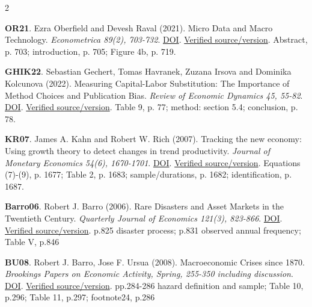 \documentclass[10pt,a4paper,landscape]{article}
\begin{document}
\begin{multicols}{2}
\begin{minipage}{\linewidth}\hypertarget{ref:OR21}{}\textbf{OR21}. Ezra Oberfield and Devesh Raval (2021). Micro Data and Macro Technology. \emph{Econometrica 89(2), 703-732}. \href{https://doi.org/10.3982/ECTA12807}{DOI}. \href{https://ezraoberfield.github.io/CESAggregation.pdf}{Verified source/version}. Abstract, p. 703; introduction, p. 705; Figure 4b, p. 719.\end{minipage}\par
\begin{minipage}{\linewidth}\hypertarget{ref:GHIK22}{}\textbf{GHIK22}. Sebastian Gechert, Tomas Havranek, Zuzana Irsova and Dominika Kolcunova (2022). Measuring Capital-Labor Substitution: The Importance of Method Choices and Publication Bias. \emph{Review of Economic Dynamics 45, 55-82}. \href{https://doi.org/10.1016/j.red.2021.05.003}{DOI}. \href{https://meta-analysis.cz/sigma/sigma2.pdf}{Verified source/version}. Table 9, p. 77; method: section 5.4; conclusion, p. 78.\end{minipage}\par
\begin{minipage}{\linewidth}\hypertarget{ref:KR07}{}\textbf{KR07}. James A. Kahn and Robert W. Rich (2007). Tracking the new economy: Using growth theory to detect changes in trend productivity. \emph{Journal of Monetary Economics 54(6), 1670-1701}. \href{https://doi.org/10.1016/j.jmoneco.2006.07.008}{DOI}. \href{https://pages.stern.nyu.edu/~jkahn/Papers/kahnrich_jme.pdf}{Verified source/version}. Equations (7)-(9), p. 1677; Table 2, p. 1683; sample/durations, p. 1682; identification, p. 1687.\end{minipage}\par
\begin{minipage}{\linewidth}\hypertarget{ref:Barro06}{}\textbf{Barro06}. Robert J. Barro (2006). Rare Disasters and Asset Markets in the Twentieth Century. \emph{Quarterly Journal of Economics 121(3), 823-866}. \href{https://doi.org/10.1162/qjec.121.3.823}{DOI}. \href{https://dash.harvard.edu/bitstreams/7312037c-67b1-6bd4-e053-0100007fdf3b/download}{Verified source/version}. p.825 disaster process; p.831 observed annual frequency; Table V, p.846\end{minipage}\par
\begin{minipage}{\linewidth}\hypertarget{ref:BU08}{}\textbf{BU08}. Robert J. Barro, Jose F. Ursua (2008). Macroeconomic Crises since 1870. \emph{Brookings Papers on Economic Activity, Spring, 255-350 including discussion}. \href{https://doi.org/10.1353/eca.0.0000}{DOI}. \href{https://www.brookings.edu/wp-content/uploads/2008/03/2008a_bpea_barro.pdf}{Verified source/version}. pp.284-286 hazard definition and sample; Table 10, p.296; Table 11, p.297; footnote24, p.286\end{minipage}\par

\end{multicols}
\end{document}
